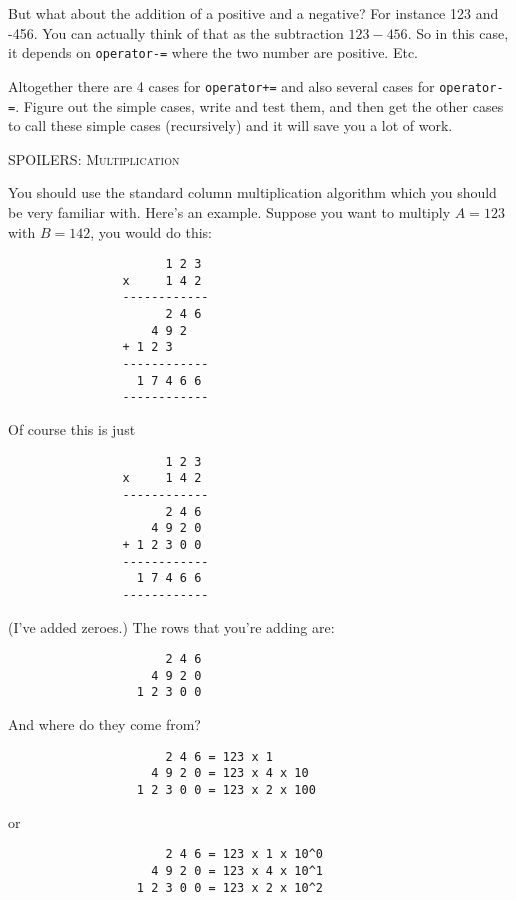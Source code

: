 But what about the addition of a positive and a 
negative? For instance 123 and -456. You can actually think of that as the subtraction 
$123 - 456$. So in this case, it depends on \verb!operator-=! where the two number are 
positive. Etc.

Altogether there are 4 cases for \verb!operator+=! and also several cases for \verb!operator-=!.
Figure out the simple cases, write and test them, and then
get the other cases to call these simple cases (recursively) and it will
save you a lot of work.


\newpage
\textsc{SPOILERS: Multiplication}

You should use the standard column multiplication algorithm which you should be very 
familiar with. Here's an example. Suppose you want to multiply $A = 123$ with $B = 142$, you would do this:

\begin{Verbatim}
                      1 2 3
                x     1 4 2
                ------------
                      2 4 6
                    4 9 2
                + 1 2 3
                ------------
                  1 7 4 6 6
                ------------
\end{Verbatim}

Of course this is just

\begin{Verbatim}
                      1 2 3
                x     1 4 2
                ------------
                      2 4 6
                    4 9 2 0
                + 1 2 3 0 0
                ------------
                  1 7 4 6 6
                ------------
\end{Verbatim}

(I've added zeroes.) The rows that you're adding are:

\begin{Verbatim}
                      2 4 6
                    4 9 2 0
                  1 2 3 0 0
\end{Verbatim}

And where do they come from?

\begin{Verbatim}
                      2 4 6 = 123 x 1
                    4 9 2 0 = 123 x 4 x 10
                  1 2 3 0 0 = 123 x 2 x 100
\end{Verbatim}

or

\begin{Verbatim}
                      2 4 6 = 123 x 1 x 10^0
                    4 9 2 0 = 123 x 4 x 10^1
                  1 2 3 0 0 = 123 x 2 x 10^2
\end{Verbatim}

